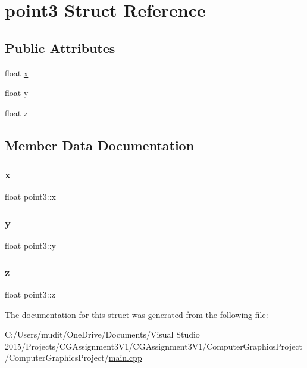 \hypertarget{structpoint3}{}\section{point3 Struct Reference}
\label{structpoint3}
\subsection*{Public Attributes}
\begin{DoxyCompactItemize}
\item 
float \hyperlink{structpoint3_aea247c715872b7973d9cfc18b7143b90}{x}
\item 
float \hyperlink{structpoint3_a55951af1fd6d03230ffde48142e5229b}{y}
\item 
float \hyperlink{structpoint3_a72b1c18f7a71ef3b4f2c57248870cde5}{z}
\end{DoxyCompactItemize}


\subsection{Member Data Documentation}
\hypertarget{structpoint3_aea247c715872b7973d9cfc18b7143b90}{}\label{structpoint3_aea247c715872b7973d9cfc18b7143b90} 
\subsubsection{\texorpdfstring{x}{x}}
{\footnotesize\ttfamily float point3\+::x}

\hypertarget{structpoint3_a55951af1fd6d03230ffde48142e5229b}{}\label{structpoint3_a55951af1fd6d03230ffde48142e5229b} 
\subsubsection{\texorpdfstring{y}{y}}
{\footnotesize\ttfamily float point3\+::y}

\hypertarget{structpoint3_a72b1c18f7a71ef3b4f2c57248870cde5}{}\label{structpoint3_a72b1c18f7a71ef3b4f2c57248870cde5} 
\subsubsection{\texorpdfstring{z}{z}}
{\footnotesize\ttfamily float point3\+::z}



The documentation for this struct was generated from the following file\+:\begin{DoxyCompactItemize}
\item 
C\+:/\+Users/mudit/\+One\+Drive/\+Documents/\+Visual Studio 2015/\+Projects/\+C\+G\+Assignment3\+V1/\+C\+G\+Assignment3\+V1/\+Computer\+Graphics\+Project/\+Computer\+Graphics\+Project/\hyperlink{main_8cpp}{main.\+cpp}\end{DoxyCompactItemize}
